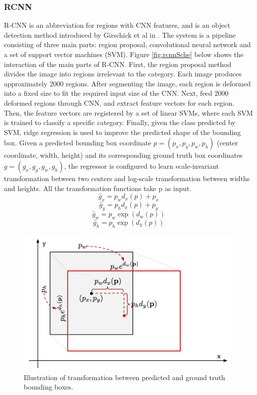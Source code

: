 \subsubsection{RCNN}
R-CNN is an abbreviation for regions with CNN features, and is an object detection method introduced by Girschick et al in \cite{DBLP:journals/corr/GirshickDDM13}. The system is a pipeline consisting of three main parts: region proposal, convolutional neural network and a set of support vector machines (SVM).
Figure \ref{fig:rcnnSche} below shows the interaction of the main parts of R-CNN. First, the region proposal method divides the image into regions irrelevant to the category. Each image produces approximately 2000 regions. After segmenting the image, each region is deformed into a fixed size to fit the required input size of the CNN. Next, feed 2000 deformed regions through CNN, and extract feature vectors for each region. Then, the feature vectors are registered by a set of linear SVMs, where each SVM is trained to classify a specific category. Finally, given the class predicted by SVM, ridge regression is used to improve the predicted shape of the bounding box. Given a predicted bounding box coordinate \(p=(p_x,p_y,p_w,p_h)\) (center coordinate, width, height) and its corresponding ground truth box coordinates \(g=(g_x,g_y,g_w,g_h )\), the regressor is configured to learn scale-invariant transformation between two centers and log-scale transformation between widths and heights. All the transformation functions take p as input.
\begin{equation}
	\hat g_x=p_w d_x (p)+p_x
\end{equation}
\begin{equation}
	\hat g_y=p_h d_x (p)+p_y
\end{equation}
\begin{equation}
	\hat g_w=p_w \exp{(d_w(p))}
\end{equation}
\begin{equation}
	\hat g_h=p_h \exp{(d_h(p))}
\end{equation}
\begin{figure}
	\centerline{\includegraphics[width=0.5\linewidth]{Figs/rcnnTrans.png}}
	\caption{Illustration of transformation between predicted and ground truth bounding boxes.}
	\label{fig:rcnnTrans}
\end{figure}
